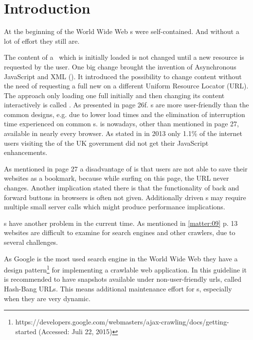 \section{Introduction}
At the beginning of the World Wide Web \webPage{}s were self-contained. 
And without a lot of effort they still are. 

The content of a \webPage{} which is initially loaded is not changed until a new resource is requested by the user.
One big change brought the invention of Asynchronous JavaScript and XML (\ajax{}). It introduced the possibility to change content without the need of requesting a full new \webPage{} on a different Uniform Resource Locator (URL).
The approach only loading one full \webPage{} initially and then changing its content interactively is called \singlePageApplication{}.
As presented in \cite{bib:jonsson09} page 26f. \singlePageApplication{}s are more user-friendly than the common designs, e.g. due to lower load times and the elimination of interruption time experienced on common \webApplication{}s.
\ajax{} is nowadays, other than mentioned in \cite{bib:jonsson09} page 27, available in nearly every browser.
As stated in \cite{bib:gov_uk13} in 2013 only 1.1\% of the internet users visiting the \webSite{} of the UK government did not get their JavaScript enhancements.

As mentioned in \cite{bib:jonsson09} page 27 a disadvantage of \ajax{} is that users are not able to save their websites as a bookmark, because while surfing on this page, the URL never changes.
Another implication stated there is that the functionality of back and forward buttons in browsers is often not given.
Additionally \ajax{} driven \webApplication{}s may require multiple small server calls which might produce performance implications.

\singlePageApplication{}s have another problem in the current time. 
As mentioned in \ref{matter:09} p. 13 \ajax{} websites are difficult to examine for search engines and other crawlers, due to several challenges.

As Google is the most used search engine in the World Wide Web they have a design pattern\footnote{https://developers.google.com/webmasters/ajax-crawling/docs/getting-started (Accessed: Juli 22, 2015)} for implementing a crawlable \ajax{} web application.
In this guideline it is recommended to have snapshots available under non-user-friendly \gls{url}s, called Hash-Bang URLs.
This means additional maintenance effort for \webSite{}s, especially when they are very dynamic.

